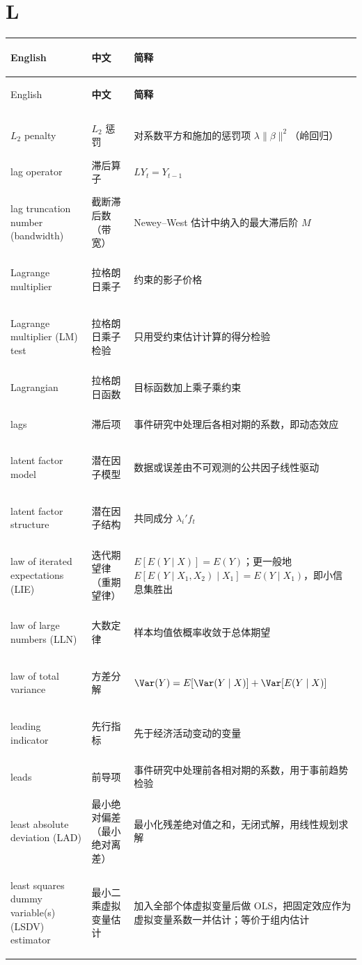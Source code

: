 \section*{L}
\begin{longtable}{@{}>{\bfseries\boldmath\raggedright\arraybackslash}p{4.6cm}>{\raggedright\arraybackslash}p{3.2cm}>{\raggedright\arraybackslash}p{\dimexpr\textwidth-7.8cm-4\tabcolsep\relax}@{}}
\toprule
English & \textbf{中文} & \textbf{简释}\\
\midrule
\endfirsthead
\toprule
English & \textbf{中文} & \textbf{简释}\\
\midrule
\endhead
\midrule
\multicolumn{3}{r@{}}{\footnotesize\itshape （续下页）}\\
\endfoot
\bottomrule
\endlastfoot
$L_2$ penalty & $L_2$ 惩罚 & 对系数平方和施加的惩罚项 $\lambda\|\beta\|^2$（岭回归） \\
lag operator & 滞后算子 & $LY_t=Y_{t-1}$ \\
lag truncation number (bandwidth) & 截断滞后数（带宽） & Newey--West 估计中纳入的最大滞后阶 $M$ \\
Lagrange multiplier & 拉格朗日乘子 & 约束的影子价格 \\
Lagrange multiplier (LM) test & 拉格朗日乘子检验 & 只用受约束估计计算的得分检验 \\
Lagrangian & 拉格朗日函数 & 目标函数加上乘子乘约束 \\
lags & 滞后项 & 事件研究中处理后各相对期的系数，即动态效应 \\
latent factor model & 潜在因子模型 & 数据或误差由不可观测的公共因子线性驱动 \\
latent factor structure & 潜在因子结构 & 共同成分 $\lambda_i'f_t$ \\
law of iterated expectations (LIE) & 迭代期望律（重期望律） & $E[E(Y\mid X)]=E(Y)$；更一般地 $E[E(Y\mid X_1,X_2)\mid X_1]=E(Y\mid X_1)$，即小信息集胜出 \\
law of large numbers (LLN) & 大数定律 & 样本均值依概率收敛于总体期望 \\
law of total variance & 方差分解 & $\Var(Y)=E[\Var(Y\mid X)]+\Var[E(Y\mid X)]$ \\
leading indicator & 先行指标 & 先于经济活动变动的变量 \\
leads & 前导项 & 事件研究中处理前各相对期的系数，用于事前趋势检验 \\
least absolute deviation (LAD) & 最小绝对偏差（最小绝对离差） & 最小化残差绝对值之和，无闭式解，用线性规划求解 \\
least squares dummy variable(s) (LSDV) estimator & 最小二乘虚拟变量估计 & 加入全部个体虚拟变量后做 OLS，把固定效应作为虚拟变量系数一并估计；等价于组内估计 \\

\end{longtable}
